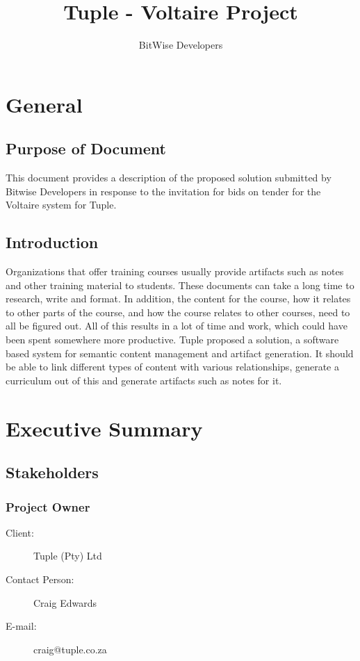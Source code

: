 \documentclass[a4paper]{article}
\title{Tuple - Voltaire Project}
\author{BitWise Developers}
\begin{document}
\maketitle
	\section{General}

		\subsection{Purpose of Document}

This document provides a description of the proposed solution submitted by Bitwise  Developers in response to the invitation for bids on tender for the Voltaire system for Tuple.

		\subsection{Introduction}
Organizations that offer training courses usually provide artifacts such as notes and other training material to students. These documents can take a long time to research, write and format. In addition, the content for the course, how it relates to other parts of the course, and how the course relates to other courses, need to all be figured out. All of this results in a lot of time and work, which could have been spent somewhere more productive. Tuple proposed a solution, a software based system for semantic content management and artifact generation. It should be able to link different types of content with various relationships, generate a curriculum out of this and generate artifacts such as notes for it.
		

	\section{Executive Summary}

\subsection{Stakeholders}

			\subsubsection{Project Owner}

				\begin{description}
					\item[Client:] Tuple (Pty) Ltd
					\item[Contact Person:] Craig Edwards
					\item[E-mail:] craig@tuple.co.za
				\end{description}
\end{document}

